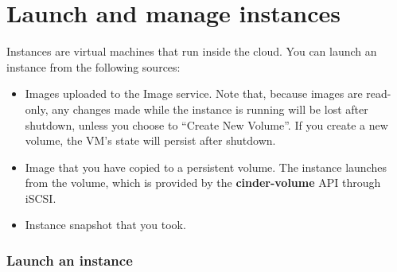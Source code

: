 \chapter{Launch and manage instances}\label{cha:launch-manage-inst}

Instances are virtual machines that run inside the cloud. You can launch
an \gls{instance} from the following sources:

\begin{itemize}
\item Images uploaded to the Image service.  Note that, because images
    are read-only, any changes made while the instance is running will
    be lost after shutdown, unless you choose to ``Create New
    Volume''.  If you create a new volume, the VM's state will persist
    after shutdown.
  \item Image that you have copied to a persistent volume. The instance
  launches from the volume, which is provided by the
  \textbf{cinder-volume} API through iSCSI.
\item Instance snapshot that you took.
\end{itemize}

\subsection*{Launch an instance}\label{launch-an-instance}

